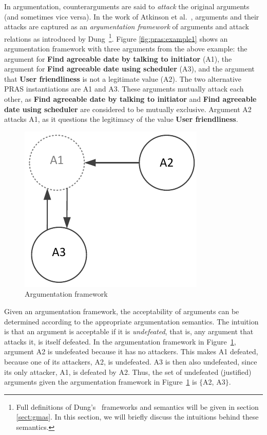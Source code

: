 In argumentation, counterarguments are said to \emph{attack} the original arguments (and sometimes vice versa). In the work of Atkinson et al.~\cite{atkinson2007}, arguments and their attacks are captured as an \emph{argumentation framework} of arguments and attack relations as introduced by Dung~\cite{Dung1995}\footnote{Full definitions of Dung's~\cite{Dung1995} frameworks and semantics will be given in section \ref{sect:gmas}. In this section, we will briefly discuss the intuitions behind these semantics.}. Figure \ref{fig:pras:example1} shows an argumentation framework with three arguments from the above example: the argument for \textbf{Find agreeable date by talking to initiator} (A1), the argument for \textbf{Find agreeable date using scheduler} (A3), and the argument that \textbf{User friendliness} is not a legitimate value (A2). The two alternative PRAS instantiations are A1 and A3. These arguments mutually attack each other, as \textbf{Find agreeable date by talking to initiator}  and \textbf{Find agreeable date using scheduler} are considered to be mutually exclusive. Argument A2 attacks A1, as it questions the legitimacy of the value \textbf{User friendliness}. 

\begin{figure}[ht]
\centering
\includegraphics[scale=0.8]{img/Fig1}
\caption{Argumentation framework}
\label{fig:pras:example}
\end{figure}

Given an argumentation framework, the acceptability of arguments can be determined according to the appropriate argumentation semantics. The intuition is that an argument is acceptable if it is \emph{undefeated}, that is, any argument that attacks it, is itself defeated. In the argumentation framework in Figure~\ref{fig:pras:example}, argument A2 is undefeated because it has no attackers. This makes A1 defeated, because one of its attackers, A2, is undefeated. A3 is then also undefeated, since its only attacker, A1, is defeated by A2. Thus, the set of undefeated (justified) arguments given the argumentation framework in Figure~\ref{fig:pras:example} is $\{$A2, A3$\}$. 


